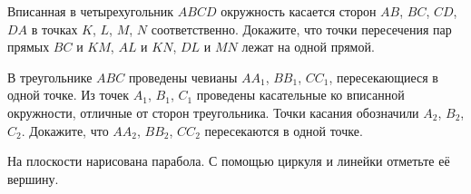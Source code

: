\begin{problems}
\item
Вписанная в четырехугольник $ABCD$ окружность касается сторон
$AB$, $BC$, $CD$, $DA$ в точках $K$, $L$, $M$, $N$ соответственно.
Докажите, что точки пересечения пар прямых $BC$ и $KM$, $AL$ и $KN$, $DL$ и
$MN$ лежат на одной прямой.

\item
В треугольнике $ABC$ проведены чевианы $A A_1$, $B B_1$, $C C_1$,
пересекающиеся в одной точке.
Из точек $A_1$, $B_1$, $C_1$ проведены касательные ко вписанной окружности,
отличные от сторон треугольника.
Точки касания обозначили $A_2$, $B_2$, $C_2$.
Докажите, что $A A_2$, $B B_2$, $C C_2$ пересекаются в одной точке.

\item
На плоскости нарисована парабола.
С помощью циркуля и линейки отметьте её вершину.

\end{problems}

